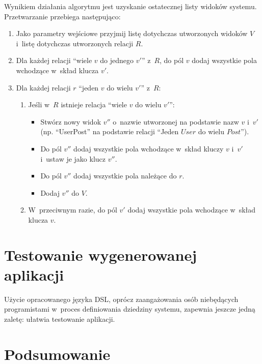 Wynikiem działania algorytmu jest uzyskanie ostatecznej listy widoków systemu.
Przetwarzanie przebiega następująco:

\begin{enumerate}
 \item Jako parametry wejściowe przyjmij listę dotychczas utworzonych widoków $V$ i~listę dotychczas utworzonych relacji $R$.
 
 \item Dla każdej relacji ``wiele $v$ do jednego $v'$'' z~$R$, do pól $v$ dodaj wszystkie pola wchodzące w~skład klucza $v'$.
 
 \item Dla każdej relacji $r$ ``jeden $v$ do wielu $v'$'' z~$R$:
  \begin{enumerate}
   \item Jeśli w~$R$ istnieje relacja ``wiele $v$ do wielu $v'$'':
    \begin{itemize}
     \item Stwórz nowy widok $v''$ o~nazwie utworzonej na podstawie nazw $v$ i~$v'$ (np. ``UserPost'' na podstawie relacji ``Jeden $User$ do wielu $Post$'').
     \item Do pól $v''$ dodaj wszystkie pola wchodzące w~skład kluczy $v$ i~$v'$ i~ustaw je jako klucz $v''$.
     \item Do pól $v''$ dodaj wszystkie pola należące do $r$.
     \item Dodaj $v''$ do $V$.
    \end{itemize}
   \item W~przeciwnym razie, do pól $v'$ dodaj wszystkie pola wchodzące w~skład klucza $v$.
  \end{enumerate}
\end{enumerate}



\section{Testowanie wygenerowanej aplikacji}

Użycie opracowanego języka DSL, oprócz zaangażowania osób niebędących programistami w~proces definiowania dziedziny systemu, zapewnia jeszcze jedną zaletę: ułatwia testowanie aplikacji.



\section{Podsumowanie}


